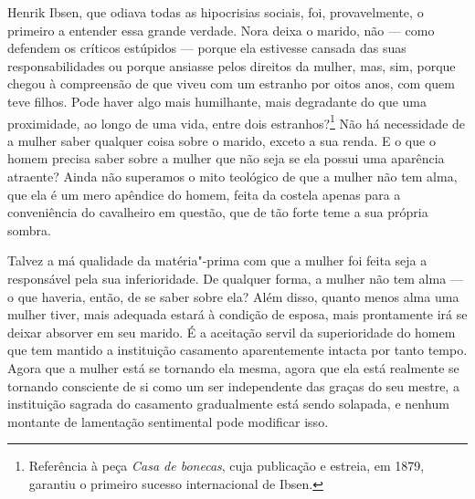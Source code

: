 Henrik Ibsen, que odiava todas as hipocrisias sociais, foi, provavelmente,
o primeiro a entender essa grande verdade. Nora deixa o marido,
não --- como defendem os críticos estúpidos --- porque ela estivesse
cansada das suas responsabilidades ou porque ansiasse pelos direitos da
mulher, mas, sim, porque chegou à compreensão de que viveu com um
estranho por oitos anos, com quem teve filhos. Pode haver algo mais
humilhante, mais degradante do que uma proximidade, ao longo de uma
vida, entre dois estranhos?\footnote{Referência à peça \textit{Casa de bonecas}, cuja publicação e estreia, em 1879, garantiu o primeiro sucesso internacional de Ibsen.} Não há necessidade de a mulher saber
qualquer coisa sobre o marido, exceto a sua renda. E o que o homem
precisa saber sobre a mulher que não seja se ela possui uma aparência
atraente? Ainda não superamos o mito teológico de que a mulher não tem
alma, que ela é um mero apêndice do homem, feita da costela apenas para
a conveniência do cavalheiro em questão, que de tão forte teme a sua
própria sombra.\label{ref7}

Talvez a má qualidade da matéria"-prima com que a mulher foi feita seja a
responsável pela sua inferioridade. De qualquer forma, a mulher não tem
alma --- o que haveria, então, de se saber sobre ela? Além disso, quanto
menos alma uma mulher tiver, mais adequada estará à condição de esposa,
mais prontamente irá se deixar absorver em seu marido. É a aceitação
servil da superioridade do homem que tem mantido a instituição casamento
aparentemente intacta por tanto tempo. Agora que a mulher está se
tornando ela mesma, agora que ela está realmente se tornando consciente
de si como um ser independente das graças do seu mestre, a instituição
sagrada do casamento gradualmente está sendo solapada, e nenhum montante
de lamentação sentimental pode modificar isso.

